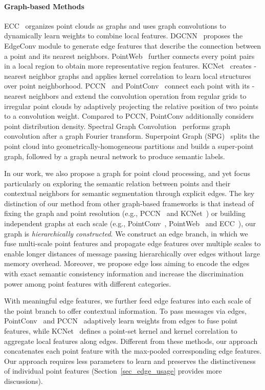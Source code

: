 \documentclass[10pt,twocolumn,letterpaper]{article}
\begin{document}
\vspace{-3mm}
\paragraph{Graph-based Methods}
ECC~\cite{edgefilter} organizes point clouds as graphs and uses graph convolutions to dynamically learn weights to combine local features.
DGCNN~\cite{dgcnn} proposes the EdgeConv module to generate edge features that describe the connection between a point and its nearest neighbors.  
PointWeb~\cite{pointweb} further connects every point pairs in a local region to obtain more representative region features. 
KCNet~\cite{kcnet} creates -nearest neighbor graphs and applies kernel correlation to learn local structures over point neighborhood.   
PCCN~\cite{continuousconv} and PointConv~\cite{pointconv} connect each point with its -nearest neighbors and extend the convolution operation from regular grids to irregular point clouds by adaptively projecting the relative position of two points to a convolution weight. Compared to PCCN, PointConv additionally considers point distribution density.
Spectral Graph Convolution~\cite{spectralconv} performs graph convolution after a graph Fourier transform.
Superpoint Graph (SPG)~\cite{spg} splits the point cloud into geometrically-homogeneous partitions and builds a super-point graph, followed by a graph neural network to produce semantic labels.

In our work, we also propose a graph for point cloud processing, and yet focus particularly on exploring the semantic relation between points and their contextual neighbors for semantic segmentation through explicit edges. 
The key distinction of our method from other graph-based frameworks is that instead of fixing the graph and point resolution (e.g., PCCN~\cite{continuousconv} and KCNet~\cite{kcnet}) or building independent graphs at each scale (e.g., PointConv~\cite{pointconv}, PointWeb~\cite{pointweb} and ECC~\cite{edgefilter}), our graph is \emph{hierarchically constructed}. We construct an edge branch, in which we fuse multi-scale point features and propagate edge features over multiple scales to enable longer distances of message passing hierarchically over edges without large memory overhead.
Moreover, we propose edge loss aiming to encode the edges with exact semantic consistency information and increase the discrimination power among point features with different categories. 

With meaningful edge features, we further feed edge features into each scale of the point branch to offer contextual information. To pass messages via edges, PointConv~\cite{pointconv} and PCCN~\cite{continuousconv} adaptively learn weights from edges to fuse point features, while KCNet~\cite{kcnet} defines a point-set kernel and kernel correlation to aggregate local features along edges. Different from these methods, our approach concatenates each point feature with the max-pooled corresponding edge features. Our approach requires less parameters to learn and preserves the distinctiveness of individual point features (Section~\ref{sec_edge_usage} provides more discussions). 
\end{document}
